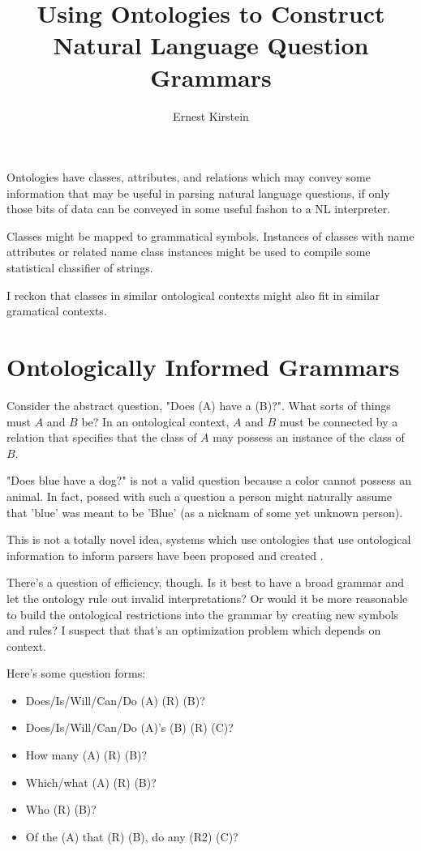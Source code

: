 \documentclass[11pt]{article}
\begin{document}
\title{Using Ontologies to Construct Natural Language Question Grammars}
\author{Ernest Kirstein}
\maketitle

Ontologies have classes, attributes, and relations which may convey some information
that may be useful in parsing natural language questions, if only those bits of data
can be conveyed in some useful fashon to a NL interpreter.

Classes might be mapped to grammatical symbols. Instances of classes with name
attributes or related name class instances might be used to compile some
statistical classifier of strings.

I reckon that classes in similar ontological contexts might also fit in similar gramatical contexts.

\section*{Ontologically Informed Grammars}

Consider the abstract question, "Does (A) have a (B)?".
What sorts of things must $A$ and $B$ be? 
In an ontological context, $A$ and $B$ must be connected by a relation
that specifies that the class of $A$ may possess an instance of the class of $B$.

"Does blue have a dog?" is not a valid question because a color cannot possess
an animal. In fact, possed with such a question a person might naturally assume
that 'blue' was meant to be 'Blue' (as a nicknam of some yet unknown person).

This is not a totally novel idea, systems which use ontologies that use
ontological information to inform parsers have been proposed and created \cite{ontgram}.

There's a question of efficiency, though. Is it best to have a broad grammar
and let the ontology rule out invalid interpretations?
Or would it be more reasonable to build the ontological restrictions into the grammar
by creating new symbols and rules? I suspect that that's an optimization problem
which depends on context.

Here's some question forms:

\begin{itemize}
\item Does/Is/Will/Can/Do (A) (R) (B)?
\item Does/Is/Will/Can/Do (A)'s (B) (R) (C)?
\item How many (A) (R) (B)?
\item Which/what (A) (R) (B)?
\item Who (R) (B)?
\item Of the (A) that (R) (B), do any (R2) (C)? 
\end{itemize}
\end{document}
